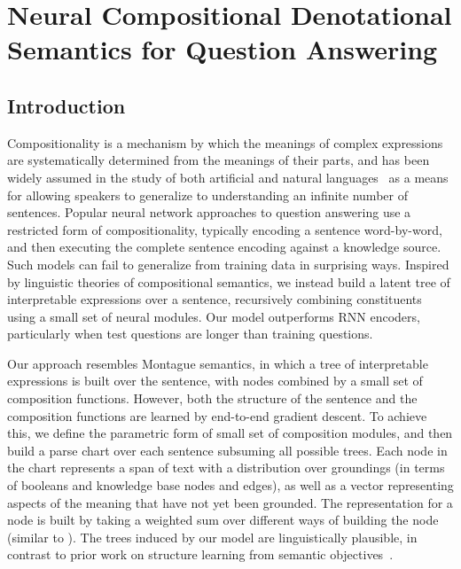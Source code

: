 \documentclass[main.tex]{subfiles}
\begin{document}
\section{Neural Compositional Denotational Semantics for Question Answering} %
\label{sec:denotation-semantics}

\subsection{Introduction}
Compositionality is a mechanism by which the meanings of complex expressions are systematically determined from the meanings of their parts, and has been widely assumed in the study of both artificial and natural languages~\cite{montague-semantics} as a means for allowing speakers to generalize to understanding an infinite number of sentences. Popular neural network approaches to question answering use a restricted form of compositionality, typically encoding a sentence word-by-word, and then executing the complete sentence encoding against a knowledge source. Such models can fail to generalize from training data in surprising ways. Inspired by linguistic theories of compositional semantics, we instead build a latent tree of interpretable expressions over a sentence, recursively combining constituents using a small set of neural modules. Our model outperforms RNN encoders, particularly when test questions are longer than training questions.

Our approach resembles Montague semantics, in which a tree of interpretable expressions is built over the sentence, with nodes combined by a small set of composition functions. %
However, both the structure of the sentence and the composition functions are learned by end-to-end gradient descent. To achieve this, we define the parametric form of small set of composition modules, and then build a parse chart over each sentence subsuming all possible trees. Each node in the chart represents a span of text with a distribution over groundings (in terms of booleans and knowledge base nodes and edges), as well as a vector representing aspects of the meaning that have not yet been grounded. The representation for a node is built by taking a weighted sum over different ways of building the node (similar to ). The trees induced by our model are linguistically plausible, in contrast to prior work on structure learning from semantic objectives~\cite{williams-latenttree-2018}.
\end{document}
